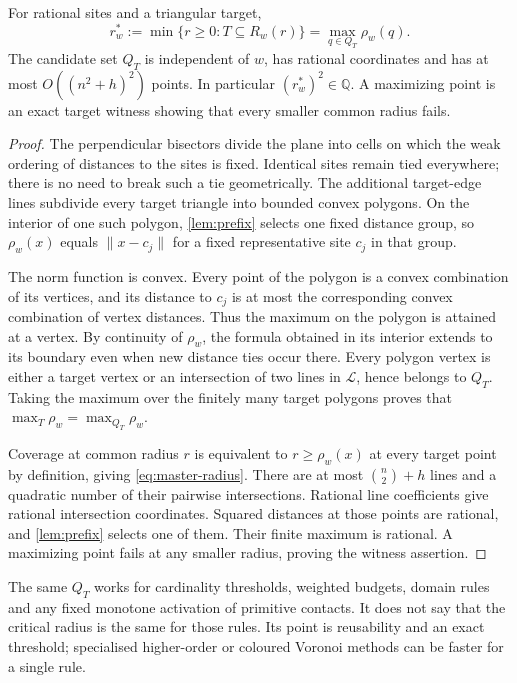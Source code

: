 \begin{theorem}\label{thm:master-radius}
For rational sites and a triangular target,
\begin{equation}\label{eq:master-radius}
r_w^*:=\min\{r\ge0:T\subseteq R_w(r)\}
=\max_{q\in Q_T}\rho_w(q).
\end{equation}
The candidate set $Q_T$ is independent of $w$, has rational coordinates and has at most $O((n^2+h)^2)$ points. In particular $(r_w^*)^2\in\mathbb Q$. A maximizing point is an exact target witness showing that every smaller common radius fails.
\end{theorem}
\begin{proof}
The perpendicular bisectors divide the plane into cells on which the weak ordering of distances to the sites is fixed. Identical sites remain tied everywhere; there is no need to break such a tie geometrically. The additional target-edge lines subdivide every target triangle into bounded convex polygons. On the interior of one such polygon, \cref{lem:prefix} selects one fixed distance group, so $\rho_w(x)$ equals $\|x-c_j\|$ for a fixed representative site $c_j$ in that group.

The norm function is convex. Every point of the polygon is a convex combination of its vertices, and its distance to $c_j$ is at most the corresponding convex combination of vertex distances. Thus the maximum on the polygon is attained at a vertex. By continuity of $\rho_w$, the formula obtained in its interior extends to its boundary even when new distance ties occur there. Every polygon vertex is either a target vertex or an intersection of two lines in $\mathscr L$, hence belongs to $Q_T$. Taking the maximum over the finitely many target polygons proves that $\max_T\rho_w=\max_{Q_T}\rho_w$.

Coverage at common radius $r$ is equivalent to $r\ge\rho_w(x)$ at every target point by definition, giving \cref{eq:master-radius}. There are at most $\binom n2+h$ lines and a quadratic number of their pairwise intersections. Rational line coefficients give rational intersection coordinates. Squared distances at those points are rational, and \cref{lem:prefix} selects one of them. Their finite maximum is rational. A maximizing point fails at any smaller radius, proving the witness assertion.
\end{proof}

\begin{remark}
The same $Q_T$ works for cardinality thresholds, weighted budgets, domain rules and any fixed monotone activation of primitive contacts. It does not say that the critical radius is the same for those rules. Its point is reusability and an exact threshold; specialised higher-order or coloured Voronoi methods can be faster for a single rule.
\end{remark}

